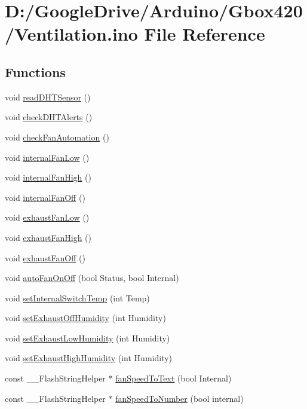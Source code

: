 \hypertarget{_ventilation_8ino}{}\section{D\+:/\+Google\+Drive/\+Arduino/\+Gbox420/\+Ventilation.ino File Reference}
\label{_ventilation_8ino}
\subsection*{Functions}
\begin{DoxyCompactItemize}
\item 
void \mbox{\hyperlink{_ventilation_8ino_addab9f8e1614db39413943ea97718749}{read\+D\+H\+T\+Sensor}} ()
\item 
void \mbox{\hyperlink{_ventilation_8ino_ade7b2fa75ae4f31edd964e625070a87f}{check\+D\+H\+T\+Alerts}} ()
\item 
void \mbox{\hyperlink{_ventilation_8ino_abe4a9d766345913306e63d4cb41f1641}{check\+Fan\+Automation}} ()
\item 
void \mbox{\hyperlink{_ventilation_8ino_aee0bd9e99a4eea02dc662a7c525fdd00}{internal\+Fan\+Low}} ()
\item 
void \mbox{\hyperlink{_ventilation_8ino_a54c4008318485af1989e3c94cddcc80c}{internal\+Fan\+High}} ()
\item 
void \mbox{\hyperlink{_ventilation_8ino_ac3655433167829c8cf8dda2d8506541a}{internal\+Fan\+Off}} ()
\item 
void \mbox{\hyperlink{_ventilation_8ino_a020e447d9d64f412e11f197943fed8f6}{exhaust\+Fan\+Low}} ()
\item 
void \mbox{\hyperlink{_ventilation_8ino_a55291f95f235e9d2e2e26759ca8d2124}{exhaust\+Fan\+High}} ()
\item 
void \mbox{\hyperlink{_ventilation_8ino_a8b57ffa8f3964f1fe353558f7e44c570}{exhaust\+Fan\+Off}} ()
\item 
void \mbox{\hyperlink{_ventilation_8ino_a1efe646523c8a1c6192234918105f04c}{auto\+Fan\+On\+Off}} (bool Status, bool Internal)
\item 
void \mbox{\hyperlink{_ventilation_8ino_a58205164752c83b6854179d44c89d29e}{set\+Internal\+Switch\+Temp}} (int Temp)
\item 
void \mbox{\hyperlink{_ventilation_8ino_aac3755d2cdd7a55948c6446a967dc7e1}{set\+Exhaust\+Off\+Humidity}} (int Humidity)
\item 
void \mbox{\hyperlink{_ventilation_8ino_a6840bb7897c12e21be3235154d43e77e}{set\+Exhaust\+Low\+Humidity}} (int Humidity)
\item 
void \mbox{\hyperlink{_ventilation_8ino_ad56f26470ecd352a5618a214a5d3c6cc}{set\+Exhaust\+High\+Humidity}} (int Humidity)
\item 
const \+\_\+\+\_\+\+Flash\+String\+Helper $\ast$ \mbox{\hyperlink{_ventilation_8ino_a2da231901bf664049d37a5f4604eec2e}{fan\+Speed\+To\+Text}} (bool Internal)
\item 
const \+\_\+\+\_\+\+Flash\+String\+Helper $\ast$ \mbox{\hyperlink{_ventilation_8ino_a63898058f3b75c4fd34dae5a1bf036bd}{fan\+Speed\+To\+Number}} (bool internal)
\end{DoxyCompactItemize}
